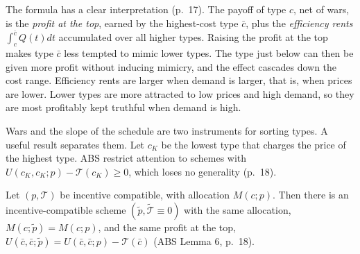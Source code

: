 The formula has a clear interpretation (p.~17). The payoff of type $c$, net of wars, is the \emph{profit at the top},
earned by the highest-cost type $\bar c$, plus the \emph{efficiency rents} $\int_c^{\bar c}Q(t)dt$ accumulated over
all higher types. Raising the profit at the top makes type $\bar c$ less tempted to mimic lower types. The type just
below can then be given more profit without inducing mimicry, and the effect cascades down the cost range. Efficiency
rents are larger when demand is larger, that is, when prices are lower. Lower types are more attracted to low prices
and high demand, so they are most profitably kept truthful when demand is high.

Wars and the slope of the schedule are two instruments for sorting types. A useful result separates them. Let
$c_K$ be the lowest type that charges the price of the highest type. ABS restrict attention to schemes with
$U(c_K, c_K; p) - \mathcal T(c_K) \ge 0$, which loses no generality (p.~18).

\begin{lemma}\label{lem:12-abs-nowar-equiv}
Let $(p, \mathcal T)$ be incentive compatible, with allocation $M(c; p)$. Then there is an incentive-compatible scheme
$(\tilde p, \tilde{\mathcal T} \equiv 0)$ with the same allocation, $M(c; \tilde p) = M(c; p)$, and the same profit at
the top, $U(\bar c, \bar c; \tilde p) = U(\bar c, \bar c; p) - \mathcal T(\bar c)$ (ABS Lemma 6, p.~18).
\end{lemma}

